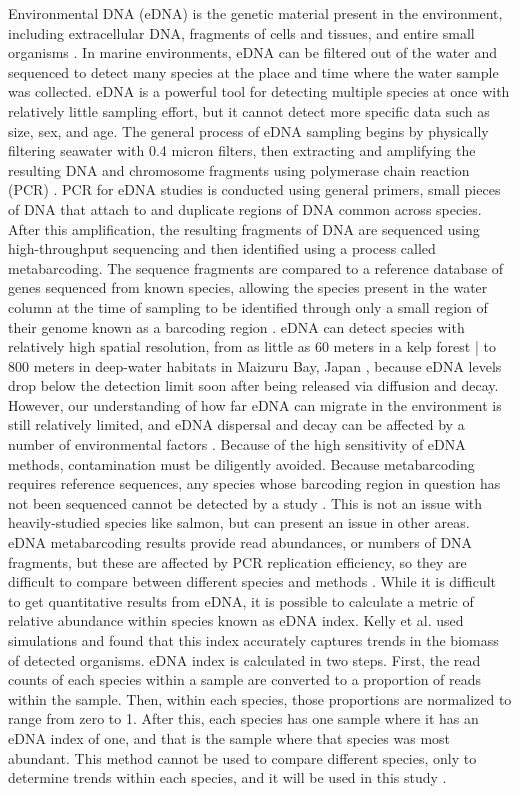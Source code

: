 \documentclass[12pt,twoside]{reedthesis}
\begin{document}
Environmental DNA (eDNA) is the genetic material present in the environment, including extracellular DNA, fragments of cells and tissues, and entire small organisms \autocite{Power2023}. In marine environments, eDNA can be filtered out of the water and sequenced to detect many species at the place and time where the water sample was collected. eDNA is a powerful tool for detecting multiple species at once with relatively little sampling effort, but it cannot detect more specific data such as size, sex, and age. The general process of eDNA sampling begins by physically filtering seawater with 0.4 micron filters, then extracting and amplifying the resulting DNA and chromosome fragments using polymerase chain reaction (PCR) \autocite{Power2023}. PCR for eDNA studies is conducted using general primers, small pieces of DNA that attach to and duplicate regions of DNA common across species. After this amplification, the resulting fragments of DNA are sequenced using high-throughput sequencing and then identified using a process called metabarcoding. The sequence fragments are compared to a reference database of genes sequenced from known species, allowing the species present in the water column at the time of sampling to be identified through only a small region of their genome known as a barcoding region \autocite{Miya2022}. eDNA can detect species with relatively high spatial resolution, from as little as 60 meters in a kelp forest \autocite{Port2016}| to 800 meters in deep-water habitats in Maizuru Bay, Japan \autocite{Yamamoto2017}, because eDNA levels drop below the detection limit soon after being released via diffusion and decay. However, our understanding of how far eDNA can migrate in the environment is still relatively limited, and eDNA dispersal and decay can be affected by a number of environmental factors \autocite{Cristescu2018}. Because of the high sensitivity of eDNA methods, contamination must be diligently avoided. Because metabarcoding requires reference sequences, any species whose barcoding region in question has not been sequenced cannot be detected by a study \autocite{Miya2022}. This is not an issue with heavily-studied species like salmon, but can present an issue in other areas. eDNA metabarcoding results provide read abundances, or numbers of DNA fragments, but these are affected by PCR replication efficiency, so they are difficult to compare between different species and methods \autocite{Miya2022}. While it is difficult to get quantitative results from eDNA, it is possible to calculate a metric of relative abundance within species known as eDNA index. Kelly et al. used simulations and found that this index accurately captures trends in the biomass of detected organisms. eDNA index is calculated in two steps. First, the read counts of each species within a sample are converted to a proportion of reads within the sample. Then, within each species, those proportions are normalized to range from zero to 1. After this, each species has one sample where it has an eDNA index of one, and that is the sample where that species was most abundant. This method cannot be used to compare different species, only to determine trends within each species, and it will be used in this study \autocite{Kelly2019}.
\end{document}
